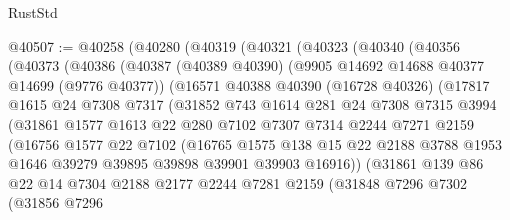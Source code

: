 \begin{lexlean}{RustStd}
\begin{coremodule}
@40507 := @40258
    (@40280
      (@40319
        (@40321
          (@40323
            (@40340
              (@40356
                (@40373
                  (@40386
                    (@40387
                      (@40389 @40390)
                      (@9905 @14692 @14688 @40377 @14699 (@9776 @40377))
                      (@16571
                        @40388
                        @40390
                        (@16728 @40326)
                        (@17817
                          @1615
                          @24
                          @7308
                          @7317
                          (@31852
                            @743
                            @1614
                            @281
                            @24
                            @7308
                            @7315
                            @3994
                            (@31861
                              @1577
                              @1613
                              @22
                              @280
                              @7102
                              @7307
                              @7314
                              @2244
                              @7271
                              @2159
                              (@16756
                                @1577
                                @22
                                @7102
                                (@16765
                                  @1575
                                  @138
                                  @15
                                  @22
                                  @2188
                                  @3788
                                  @1953
                                  @1646
                                  @39279
                                  @39895
                                  @39898
                                  @39901
                                  @39903
                                  @16916))
                              (@31861
                                @139
                                @86
                                @22
                                @14
                                @7304
                                @2188
                                @2177
                                @2244
                                @7281
                                @2159
                                (@31848
                                  @7296
                                  @7302
                                  (@31856
                                    @7296

\end{coremodule}
\end{lexlean}

